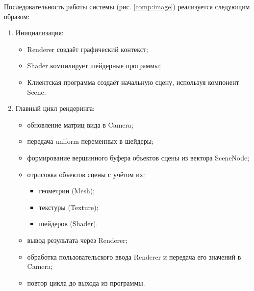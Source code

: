Последовательность работы системы (рис. \ref{comp:image}) реализуется следующим образом:

\begin{enumerate}
    \item Инициализация:

    \begin{itemize}[itemindent=\parindent,leftmargin=\parindent]
        \item Renderer создаёт графический контекст;
        \item Shader компилирует шейдерные программы;
        \item Клиентская программа создаёт начальную сцену, используя компонент Scene.
    \end{itemize}

    \item Главный цикл рендеринга:

    \begin{itemize}[itemindent=\parindent,leftmargin=\parindent]
        \item обновление матриц вида в Camera;
        \item передача uniform-переменных в шейдеры;
        \item формирование вершинного буфера объектов сцены из вектора SceneNode;
        \item отрисовка объектов сцены с учётом их:

        \begin{itemize}[itemindent=\parindent,leftmargin=\parindent]
            \item геометрии (Mesh);
            \item текстуры (Texture);
            \item шейдеров (Shader).
        \end{itemize}

        \item вывод результата через Renderer;
        \item обработка пользовательского ввода Renderer и передача его значений в Camera;
        \item повтор цикла до выхода из программы.
    \end{itemize}
\end{enumerate}
